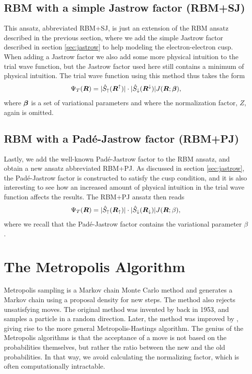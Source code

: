 \subsection{RBM with a simple Jastrow factor (RBM+SJ)} \label{sec:rbmsj}
This ansatz, abbreviated RBM+SJ, is just an extension of the RBM ansatz described in the previous section, where we add the simple Jastrow factor described in section \ref{sec:jastrow} to help modeling the electron-electron cusp. When adding a Jastrow factor we also add some more physical intuition to the trial wave function, but the Jastrow factor used here still contains a minimum of physical intuition. The trial wave function using this method thus takes the form
\begin{equation}
\Psi_T(\boldsymbol{{R}})=|\hat{S}_{\uparrow}(\boldsymbol{{R}}^{\uparrow})|\cdot|\hat{S}_{\downarrow}(\boldsymbol{{R}}^{\downarrow})|J(\boldsymbol{{R}};\boldsymbol{{\beta}}),
\end{equation}
where $\boldsymbol{{\beta}}$ is a set of variational parameters and where the normalization factor, $Z$, again is omitted.  

\subsection{RBM with a Padé-Jastrow factor (RBM+PJ)} \label{sec:rbmpj}
Lastly, we add the well-known Padé-Jastrow factor to the RBM ansatz, and obtain a new ansatz abbreviated RBM+PJ. As discussed in section \ref{sec:jastrow}, the Padé-Jastrow factor is constructed to satisfy the cusp condition, and it is also interesting to see how an increased amount of physical intuition in the trial wave function affects the results. The RBM+PJ ansatz then reads
\begin{equation}
\Psi_T(\boldsymbol{{R}})=|\hat{S}_{\uparrow}(\boldsymbol{{R}}_{\uparrow})|\cdot|\hat{S}_{\downarrow}(\boldsymbol{{R}}_{\downarrow})|J(\boldsymbol{{R}};\beta),
\end{equation}
where we recall that the Padé-Jastrow factor contains the variational parameter $\beta$.

\section{The Metropolis Algorithm} \label{sec:metropolis}
Metropolis sampling is a Markov chain Monte Carlo method and generates a Markov chain using a proposal density for new steps. The method also rejects unsatisfying moves. The original method was invented by \citet{metropolis_equation_1953} back in 1953, and samples a particle in a random direction. Later, the method was improved by \citet{hastings_monte_1970}, giving rise to the more general Metropolis-Hastings algorithm. The genius of the Metropolis algorithms is that the acceptance of a move is not based on the probabilities themselves, but rather the ratio between the new and the old probabilities. In that way, we avoid calculating the normalizing factor, which is often computationally intractable.

